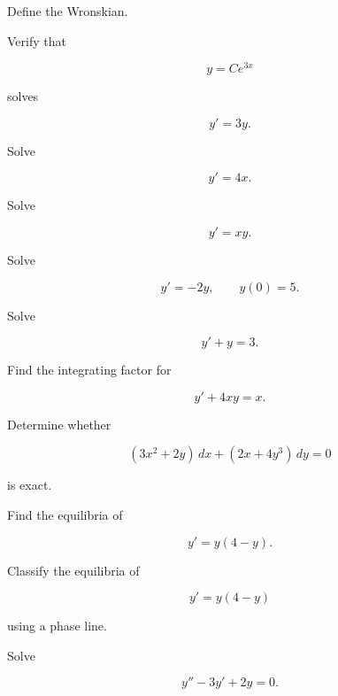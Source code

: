 \begin{exercise}[1]
Define the Wronskian.
\end{exercise}

\begin{exercise}[2]
Verify that

\[
y=Ce^{3x}
\]

solves

\[
y'=3y.
\]
\end{exercise}

\begin{exercise}[2]
Solve

\[
y'=4x.
\]
\end{exercise}

\begin{exercise}[2]
Solve

\[
y'=xy.
\]
\end{exercise}

\begin{exercise}[2]
Solve

\[
y'=-2y,
\qquad
y(0)=5.
\]
\end{exercise}

\begin{exercise}[2]
Solve

\[
y'+y=3.
\]
\end{exercise}

\begin{exercise}[2]
Find the integrating factor for

\[
y'+4xy=x.
\]
\end{exercise}

\begin{exercise}[2]
Determine whether

\[
(3x^2+2y)\,dx
+
(2x+4y^3)\,dy
=
0
\]

is exact.
\end{exercise}

\begin{exercise}[2]
Find the equilibria of

\[
y'=y(4-y).
\]
\end{exercise}

\begin{exercise}[2]
Classify the equilibria of

\[
y'=y(4-y)
\]

using a phase line.
\end{exercise}

\begin{exercise}[2]
Solve

\[
y''-3y'+2y=0.
\]
\end{exercise}

